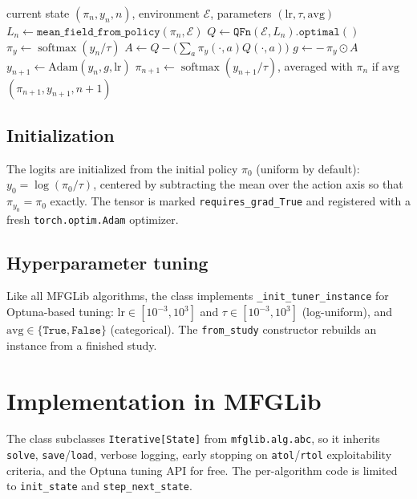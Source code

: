 \documentclass[11pt,a4paper]{article}
\begin{document}
\begin{algorithm}[H]
\caption{NeuralFictitiousPlay: one iteration}\label{alg:nfp}
\begin{algorithmic}[1]
\Require current state $(\pi_n, y_n, n)$, environment $\mathcal{E}$, parameters $(\mathrm{lr}, \tau, \mathrm{avg})$
\State $L_n \gets \texttt{mean\_field\_from\_policy}(\pi_n, \mathcal{E})$
\State $Q \gets \texttt{QFn}(\mathcal{E}, L_n).\texttt{optimal}()$
\State $\pi_y \gets \operatorname{softmax}(y_n / \tau)$ 
\State $A \gets Q - \bigl(\sum_{a} \pi_y(\cdot, a) Q(\cdot, a)\bigr)$ 
\State $g \gets -\,\pi_y \odot A$ 
\State $y_{n+1} \gets \mathrm{Adam}(y_n, g, \mathrm{lr})$
\State $\pi_{n+1} \gets \operatorname{softmax}(y_{n+1}/\tau)$, averaged with $\pi_n$ if $\mathrm{avg}$
\State \Return $(\pi_{n+1}, y_{n+1}, n+1)$
\end{algorithmic}
\end{algorithm}

\subsection{Initialization}
The logits are initialized from the initial policy $\pi_0$ (uniform by default):
$y_0 = \log(\pi_0 / \tau)$, centered by subtracting the mean over the action
axis so that $\pi_{y_0} = \pi_0$ exactly. The tensor is marked
\texttt{requires\_grad\_True} and registered with a fresh
\texttt{torch.optim.Adam} optimizer.

\subsection{Hyperparameter tuning}
Like all MFGLib algorithms, the class implements
\texttt{\_init\_tuner\_instance} for Optuna-based tuning:
$\mathrm{lr} \in [10^{-3}, 10^3]$ and $\tau \in [10^{-3}, 10^3]$ (log-uniform),
and $\mathrm{avg} \in \{\texttt{True}, \texttt{False}\}$ (categorical). The
\texttt{from\_study} constructor rebuilds an instance from a finished study.

\section{Implementation in MFGLib}

The class subclasses \texttt{Iterative[State]} from \texttt{mfglib.alg.abc},
so it inherits \texttt{solve}, \texttt{save}/\texttt{load}, verbose logging,
early stopping on \texttt{atol}/\texttt{rtol} exploitability criteria, and the
Optuna tuning API for free. The per-algorithm code is limited to
\texttt{init\_state} and \texttt{step\_next\_state}.
\end{document}
